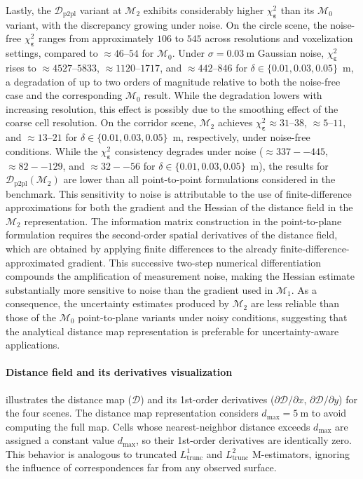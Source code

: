 Lastly, the $\mathcal{D}_\mathrm{p2pl}$ variant at $\mathcal{M}_2$ exhibits
considerably higher $\chi_{\boldsymbol{\varepsilon}}^2$ than its
$\mathcal{M}_0$ variant, with the discrepancy growing under noise.
On the circle scene, the noise-free $\chi_{\boldsymbol{\varepsilon}}^2$ ranges
from approximately $106$ to $545$ across resolutions and voxelization settings,
compared to $\approx 46$--$54$ for $\mathcal{M}_0$.
Under $\sigma = \SI{0.03}{\metre}$ Gaussian noise,
$\chi_{\boldsymbol{\varepsilon}}^2$ rises to $\approx 4527$--$5833$,
$\approx 1120$--$1717$, and $\approx 442$--$846$ for
$\delta \in \{0.01, 0.03, 0.05\}$~m, a degradation of up to
two orders of magnitude relative to both the noise-free case and the
corresponding $\mathcal{M}_0$ result. While the
degradation lowers with increasing resolution, this effect is possibly due to
the smoothing effect of the coarse cell resolution.
On the corridor scene, $\mathcal{M}_2$ achieves
$\chi_{\boldsymbol{\varepsilon}}^2\approx 31$--$38$,
$\approx 5$--$11$, and $\approx 13$--$21$ for
$\delta \in \{0.01, 0.03, 0.05\}$~m, respectively,
under noise-free conditions. While the $\chi_{\boldsymbol{\varepsilon}}^2$
consistency degrades under noise ($\approx 337--445$, $\approx 82--129$, and
$\approx 32--56$ for $\delta \in \{0.01, 0.03, 0.05\}$~m), the results for
$\mathcal{D}_\mathrm{p2pl}(\mathcal{M}_2)$ are lower than all point-to-point
formulations considered in the benchmark.
This sensitivity to noise is attributable to the use of finite-difference
approximations for both the gradient and the Hessian of the distance field in
the $\mathcal{M}_2$ representation. The information matrix construction in
the point-to-plane formulation requires the second-order spatial derivatives of
the distance field, which are obtained by applying finite differences to
the already finite-difference-approximated gradient.
This successive two-step numerical differentiation compounds the amplification
of measurement noise, making the Hessian estimate substantially more
sensitive to noise than the gradient used in $\mathcal{M}_1$.
As a consequence, the uncertainty estimates produced by $\mathcal{M}_2$ are
less reliable than those of the $\mathcal{M}_0$ point-to-plane variants under
noisy conditions, suggesting that the analytical distance map representation
is preferable for uncertainty-aware applications.

\paragraph{Distance field and its derivatives visualization}
 illustrates
the distance map ($\mathcal{D}$) and its 1st-order derivatives
($\partial\mathcal{D}/\partial x$, $\partial\mathcal{D}/\partial y$) for
the four scenes. The distance map representation considers
$d_{\max}= \SI{5}{\metre}$ to avoid computing the full map.
Cells whose nearest-neighbor distance exceeds $d_{\max}$ are assigned a
constant value $d_{\max}$, so their 1st-order derivatives are identically zero.
This behavior is analogous to truncated $L_{\mathrm{trunc}}^1$ and
$L_{\mathrm{trunc}}^2$ M-estimators, ignoring the influence of correspondences
far from any observed surface.

